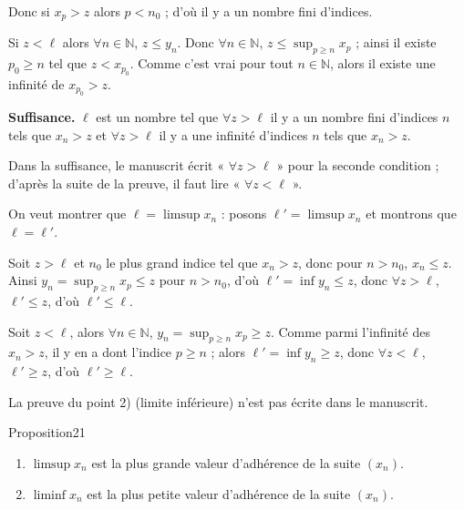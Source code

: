 \documentclass[11pt,a4paper]{article}
\newcommand{\N}{\mathbb{N}}
\begin{document}
Donc si $x_p>z$ alors $p<n_0$ ; d'où il y a un nombre fini d'indices.

Si $z<\ell$ alors $\forall n\in\N$, $z\le y_n$. Donc $\forall n\in\N$, $z\le\sup_{p\ge n}x_p$ ; ainsi il existe $p_0\ge n$ tel que $z<x_{p_0}$.
Comme c'est vrai pour tout $n\in\N$, alors il existe une infinité de $x_{p_0}>z$.

\textbf{Suffisance.} $\ell$ est un nombre tel que $\forall z>\ell$ il y a un nombre fini d'indices $n$ tels que $x_n>z$ et $\forall z>\ell$
il y a une infinité d'indices $n$ tels que $x_n>z$.

\begin{note}
Dans la suffisance, le manuscrit écrit « $\forall z>\ell$ » pour la seconde condition ; d'après la suite de la preuve, il faut lire « $\forall z<\ell$ ».
\end{note}

On veut montrer que $\ell=\limsup x_n$ : posons $\ell'=\limsup x_n$ et montrons que $\ell=\ell'$.

Soit $z>\ell$ et $n_0$ le plus grand indice tel que $x_n>z$, donc pour $n>n_0$, $x_n\le z$. Ainsi $y_n=\sup_{p\ge n}x_p\le z$ pour $n>n_0$,
d'où $\ell'=\inf y_n\le z$, donc $\forall z>\ell$, $\ell'\le z$, d'où $\ell'\le\ell$.

Soit $z<\ell$, alors $\forall n\in\N$, $y_n=\sup_{p\ge n}x_p\ge z$. Comme parmi l'infinité des $x_n>z$, il y en a dont l'indice $p\ge n$ ; alors
$\ell'=\inf y_n\ge z$, donc $\forall z<\ell$, $\ell'\ge z$, d'où $\ell'\ge\ell$.

\begin{note}
La preuve du point 2) (limite inférieure) n'est pas écrite dans le manuscrit.
\end{note}

\begin{enonce}{Proposition}{21}
\begin{enumerate}[label=\textbf{\arabic*)},leftmargin=1.2cm]
  \item $\limsup x_n$ est la plus grande valeur d'adhérence de la suite $(x_n)$.
  \item $\liminf x_n$ est la plus petite valeur d'adhérence de la suite $(x_n)$.
\end{enumerate}
\end{enonce}
\end{document}
